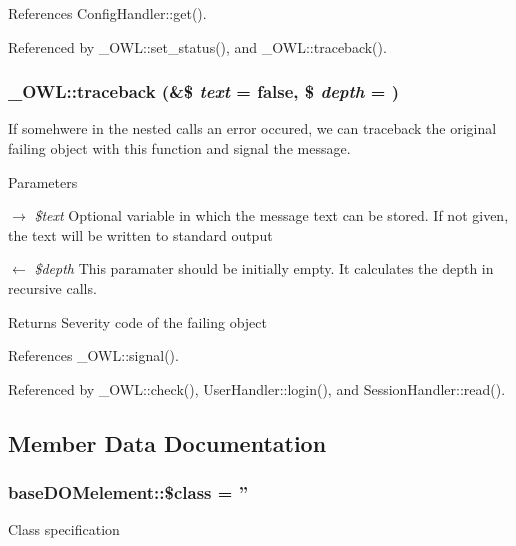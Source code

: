 References ConfigHandler::get().



Referenced by \_\-OWL::set\_\-status(), and \_\-OWL::traceback().

\subsubsection[{traceback}]{\setlength{\rightskip}{0pt plus 5cm}\_\-OWL::traceback (\&\$ {\em text} = {\ttfamily false}, \/  \$ {\em depth} = {})}\label{class__OWL_aa29547995d6741b7d2b90c1d4ea99a13}
If somehwere in the nested calls an error occured, we can traceback the original failing object with this function and signal the message.


\begin{DoxyParams}{Parameters}
\item[\mbox{$\rightarrow$} {\em \$text}]Optional variable in which the message text can be stored. If not given, the text will be written to standard output \item[\mbox{$\leftarrow$} {\em \$depth}]This paramater should be initially empty. It calculates the depth in recursive calls. \end{DoxyParams}
\begin{DoxyReturn}{Returns}
Severity code of the failing object 
\end{DoxyReturn}


References \_\-OWL::signal().



Referenced by \_\-OWL::check(), UserHandler::login(), and SessionHandler::read().



\subsection{Member Data Documentation}
\subsubsection[{\$class}]{\setlength{\rightskip}{0pt plus 5cm}baseDOMelement::\$class = ''}\label{classbaseDOMelement_a929b59866de374b581d64fa93289af53}
Class specification 
